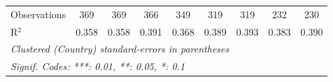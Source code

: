 \begin{tabular}{lcccccccc}
   Observations                                              & 369            & 369            & 366            & 349            & 319           & 319           & 232           & 230\\  
   R$^2$                                                     & 0.358          & 0.358          & 0.391          & 0.368          & 0.389         & 0.393         & 0.383         & 0.390\\  
   \midrule
   \multicolumn{9}{l}{\emph{Clustered (Country) standard-errors in parentheses}}\\
   \multicolumn{9}{l}{\emph{Signif. Codes: ***: 0.01, **: 0.05, *: 0.1}}\\
\end{tabular}
\par\endgroup


